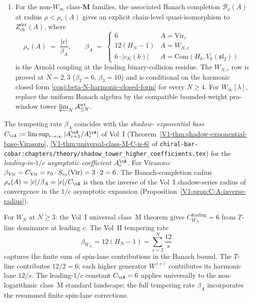 \begin{theorem}
\begin{enumerate}
 is false at generic central charge; an intermediate analytic-topology
 strengthening, if it exists, is Open Frontier~F3
 (\cref{conj:f3-original-complex-class-m}).
\item[(iii)] For the non-\(W_{\infty}\) class-\(\mathbf M\) families,
 the associated Banach completion $\mathcal{B}_{\rho}(A)$ at radius
 $\rho < \rho_{*}(A)$ gives an explicit chain-level quasi-isomorphism
 to $Z^{\mathrm{der}}_{\mathrm{ch}}(A)$, where
 \[
 \rho_{*}(A) \;=\; \frac{|c|}{\beta_{A}}, \qquad
 \beta_{A} \;=\; \begin{cases}
 6 & A = \mathrm{Vir}_{c} \\
 12(H_N - 1) & A = W_{N,c} \\
 6 \cdot |c_{K}(k)| & A = \mathrm{Com}(H_{k}, V_{k}(\mathfrak{sl}_{2}))
 \end{cases}
 \]
 is the Arnold coupling at the leading binary-collision residue.
 The $W_{N,c}$ row is proved at $N = 2, 3$ ($\beta_{2} = 6$,
 $\beta_{3} = 10$) and is conditional on the harmonic closed form
 \cref{conj:beta-N-harmonic-closed-form} for every $N \ge 4$.  For
 \(W_{\infty}[\lambda]\), replace the uniform Banach algebra by the
 compatible bounded-weight pro-window tower
 \(\varprojlim_N\mathcal A_{\le N}^{\mathrm{wt}}\).
\end{enumerate}
\end{theorem}

\begin{remark}
The tempering rate $\beta_A$ coincides with the \emph{shadow-
exponential base}
$C_\cA := \limsup_{r \to \infty} |A_{r+1}^\cA / A_r^\cA|$ of
Vol~I
(Theorem~\ref{V1-thm:shadow-exponential-base-Virasoro},
\ref{V1-thm:universal-class-M-C-is-6} of
\texttt{chiral-bar-cobar:chapters/theory/shadow\_tower\_higher\_coefficients.tex})
for the \emph{leading-in-$1/c$ asymptotic coefficient $A_r^\cA$}.
For Virasoro:
$\beta_{\mathrm{Vir}} = C_{\mathrm{Vir}} = r_0 \cdot S_{r_0}(\mathrm{Vir}) = 3 \cdot 2 = 6$.
The Banach-completion radius
$\rho_{*}(A) = |c|/\beta_A = |c|/C_\cA$ is then the inverse of the
Vol~I shadow-series radius of convergence in the $1/c$ asymptotic
expansion (Proposition~\ref{V1-prop:C-A-inverse-radius}).

For $W_N$ at $N \ge 3$: the Vol~I universal class~M theorem gives
$C_{W_N}^{\mathrm{leading}} = 6$ from $T$-line dominance at leading
$c$. The Vol~II tempering rate
\[
 \beta_{W_N}=12(H_N-1)=\sum_{s=2}^{N}\frac{12}{s}
\]
captures the finite sum of spin-lane contributions in the Banach
bound. The $T$-line contributes $12/2=6$; each higher generator
$W^{(s)}$ contributes its harmonic lane $12/s$. The leading-$1/c$
constant $C_\cA = 6$ applies universally to the non-logarithmic
class~M standard landscape; the full tempering rate $\beta_A$
incorporates the resummed finite spin-lane corrections.
\end{remark}

